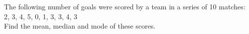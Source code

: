  The following number of goals were scored
by a team in a series of 10 matches:\\
2, 3, 4, 5, 0, 1, 3, 3, 4, 3\\
Find the mean, median and mode of these
scores.
